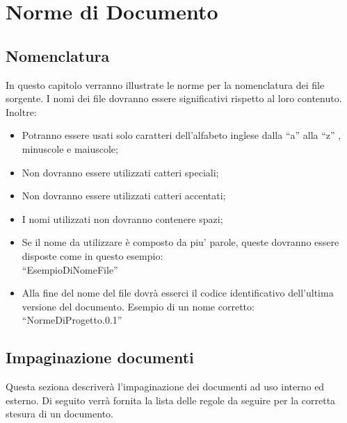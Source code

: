 \chapter{Norme di Documento}
\section{Nomenclatura}
In questo capitolo verranno illustrate le norme per la nomenclatura dei file sorgente. I nomi dei file dovranno essere significativi rispetto al loro contenuto. Inoltre:
\begin{itemize}
\item Potranno essere usati solo caratteri dell'alfabeto inglese dalla ``a'' alla ``z'' , minuscole e maiuscole;
\item Non dovranno essere utilizzati catteri speciali;
\item Non dovranno essere utilizzati catteri accentati;
\item I nomi utilizzati non dovranno contenere spazi;
\item Se il nome da utilizzare \`e composto da piu' parole, queste dovranno essere disposte come in questo esempio: \\
``EsempioDiNomeFile''
\item Alla fine del nome del file dovr\`a esserci il codice identificativo dell'ultima versione del documento.
Esempio di un nome corretto:\\
``NormeDiProgetto.0.1''
\end{itemize}
\section{Impaginazione documenti}
Questa seziona descriver\`a l'impaginazione dei documenti ad uso interno ed esterno. Di seguito verr\`a fornita la lista delle regole da seguire per la corretta stesura di un documento.
